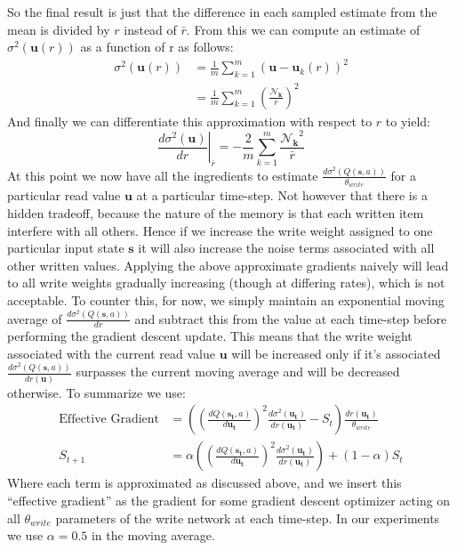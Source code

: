 \documentclass{article}
\begin{document}
So the final result is just that the difference in each sampled estimate from the mean is divided by $r$ instead of $\bar{r}$. From this we can compute an estimate of $\sigma^2(\pmb{u}(r))$ as a function of r as follows:
\begin{align*}
\sigma^2(\pmb{u}(r))&=\frac{1}{m}\sum_{k=1}^m(\pmb{u}-\pmb{u}_k(r))^2\\
&=\frac{1}{m}\sum_{k=1}^m\left(\frac{\pmb{\mathcal{N}_k}}{r}\right)^2
\end{align*}
And finally we can differentiate this approximation with respect to $r$ to yield:
$$\left.\frac{d\sigma^2(\pmb{u})}{dr}\right\rvert_{\bar{r}}=-\frac{2}{m}\sum_{k=1}^m\frac{\pmb{\mathcal{N}_k}^2}{\bar{r}}$$
At this point we now have all the ingredients to estimate $\frac{d\sigma^2(Q(\pmb{s},a))}{\theta_{write}}$ for a particular read value $\pmb{u}$ at a particular time-step. Not however that there is a hidden tradeoff, because the nature of the memory is that each written item interfere with all others. Hence if we increase the write weight assigned to one particular input state $\pmb{s}$ it will also increase the noise terms associated with all other written values. Applying the above approximate gradients naively will lead to all write weights gradually increasing (though at differing rates), which is not acceptable. To counter this, for now, we simply maintain an exponential moving average of $\frac{d\sigma^2(Q(\pmb{s},a))}{dr}$ and subtract this from the value at each time-step before performing the gradient descent update. This means that the write weight associated with the current read value $\pmb{u}$ will be increased only if it's associated $\frac{d\sigma^2(Q(\pmb{s},a))}{dr(\pmb{u})}$ surpasses the current moving average and will be decreased otherwise. To summarize we use:
\begin{align*}
\text{Effective Gradient}&=\left(\left(\frac{dQ(\pmb{s_t},a)}{d\pmb{u_t}}\right)^2\frac{d\sigma^2(\pmb{u_t})}{dr(\pmb{u_t})}-S_t\right)\frac{dr(\pmb{u_t})}{\theta_{write}}\\
S_{t+1} &=\alpha\left(\left(\frac{dQ(\pmb{s_t},a)}{d\pmb{u_t}}\right)^2\frac{d\sigma^2(\pmb{u_t})}{dr(\pmb{u_t})}\right)+(1-\alpha)S_t
\end{align*}
Where each term is approximated as discussed above, and we insert this ``effective gradient'' as the gradient for some gradient descent optimizer acting on all $\theta_{write}$ parameters of the write network at each time-step. In our experiments we use $\alpha=0.5$ in the moving average.
\end{document}
